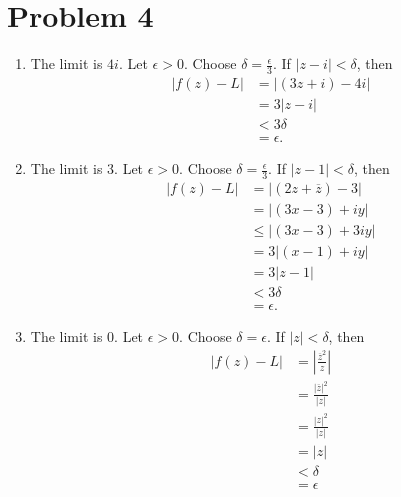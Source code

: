 \documentclass{article}
\newcommand{\cjg}[1]{\overline{#1}}
\begin{document}
\section*{Problem 4}
\begin{enumerate}
	\item The limit is $4i$. 
	Let $\epsilon > 0$.
	Choose $\delta = \frac{\epsilon}{3}$.
	If $|z - i| < \delta$, then
	\begin{align*}
		|f(z) - L| &= |(3z+i)- 4i| \\
		&= 3|z - i| \\
		&< 3\delta \\
		&= \epsilon.
	\end{align*}
	\item The limit is $3$.
	Let $\epsilon > 0$.
	Choose $\delta = \frac{\epsilon}{3}$.
	If $|z - 1| < \delta$, then
	\begin{align*}
		|f(z) - L| &= |(2z+\cjg{z})- 3| \\
		&= |(3x-3) + iy| \\
		&\leq |(3x-3) + 3iy| \\
		&= 3|(x-1) + iy| \\
		&= 3|z - 1| \\
		&< 3\delta \\
		&= \epsilon.
	\end{align*}
	\item The limit is $0$.
	Let $\epsilon > 0$.
	Choose $\delta = \epsilon$.
	If $|z| < \delta$, then 
	\begin{align*}
		|f(z) - L| &= \left| \frac{\cjg{z}^2}{z} \right|\\
		&= \frac{|\cjg{z}|^2}{|z|} \\
		&= \frac{|z|^2}{|z|} \\
		&= |z| \\
		&< \delta \\
		&= \epsilon
	\end{align*}
\end{enumerate}
\end{document}
